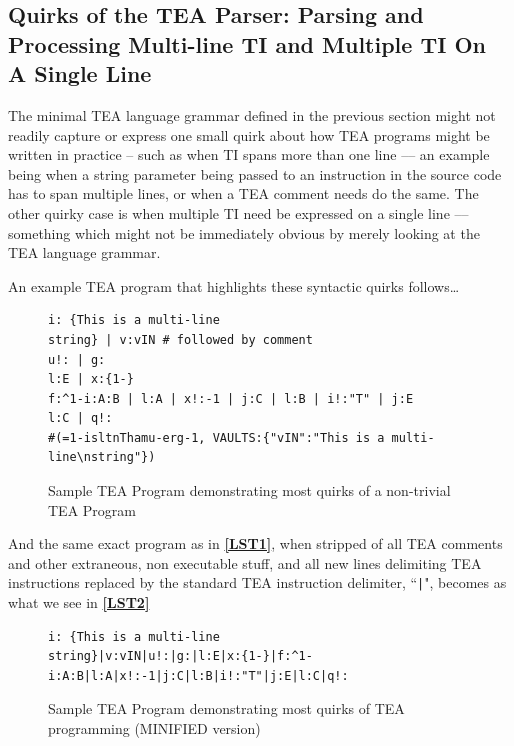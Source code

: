 \documentclass[a4paper, 18pt]{book} %
\begin{document}
\subsection{Quirks of the TEA Parser: Parsing and Processing Multi-line TI and Multiple TI On A Single Line}
\label{SECPARSE}

The minimal TEA language grammar defined in the previous section might not readily capture or express one small quirk about how TEA programs might be written in practice – such as when TI spans more than one line --– an example being when a string parameter being passed to an instruction in the source code has to span multiple lines, or when a TEA comment needs do the same. The other quirky case is when multiple TI need be expressed on a single line –-- something which might not be immediately obvious by merely looking at the TEA language grammar.


An example TEA program that highlights these syntactic quirks follows…

  \begin{figure}[H]
  \centering
  \begin{tcolorbox}[teaterminalstyle, title=TEA Program]
  \begin{lstlisting}[language=TEA, caption={TP 1}, label={LST1}]
i: {This is a multi-line
string} | v:vIN # followed by comment
u!: | g:
l:E | x:{1-}
f:^1-i:A:B | l:A | x!:-1 | j:C | l:B | i!:"T" | j:E
l:C | q!:
#(=1-isltnThamu-erg-1, VAULTS:{"vIN":"This is a multi-line\nstring"})
  \end{lstlisting}
  \end{tcolorbox}
  \caption{Sample TEA Program demonstrating most quirks of a non-trivial TEA Program}
  \label{FIG7}
\end{figure}

And the same exact program as in  \textbf{\autoref{LST1}}, when stripped of all TEA comments and other extraneous, non executable stuff, and all new lines delimiting TEA instructions replaced by the standard TEA instruction delimiter, ``\texttt{|}", becomes as what we see in \textbf{\autoref{LST2}}

 \begin{figure}[H]
  \centering
  \begin{tcolorbox}[teaterminalstyle, title=TEA Program]
  \begin{lstlisting}[language=TEA, caption={TP 2}, label={LST2}, ]
i: {This is a multi-line
string}|v:vIN|u!:|g:|l:E|x:{1-}|f:^1-i:A:B|l:A|x!:-1|j:C|l:B|i!:"T"|j:E|l:C|q!:
  \end{lstlisting}
  \end{tcolorbox}
  \caption{Sample TEA Program demonstrating most quirks of TEA programming (MINIFIED version)}
  \label{FIG8}
\end{figure}
\end{document}
